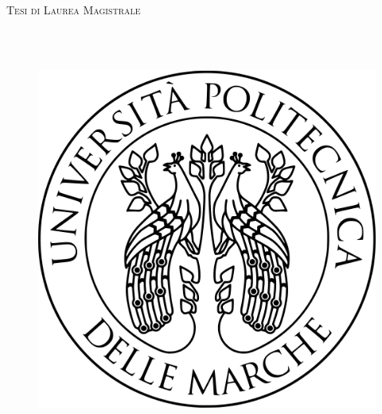 \documentclass[
12pt, %
onehalfspacing, %
headsepline, %
]{MastersDoctoralThesis} %
\author{Davide \textsc{De Zuane}} %
\begin{document}
\frontmatter %

\pagestyle{plain} %


\begin{titlepage}
\begin{center}

\vspace*{.06\textheight}
{\scshape\LARGE \univname\par}\vspace{0.5cm} %
\deptname\\[2cm] %
\textsc{\Large Tesi di Laurea Magistrale}\\[0.5cm] %

\HRule \\[0.4cm] %
{\huge \bfseries \ttitle\par}\vspace{0.4cm} %
\HRule \\[1cm] %

\begin{figure}[ht!]
	\centering
	\includegraphics[scale=0.15]{Figures/unvimplogo.png}
\end{figure}
\vspace{1cm}



\end{center}
\end{titlepage}
\end{document}
